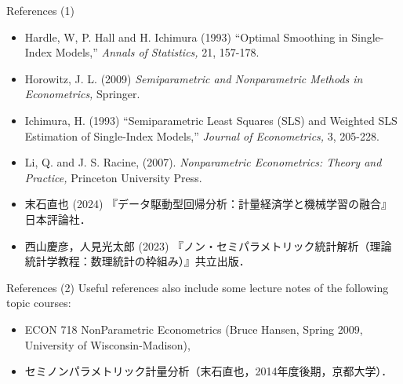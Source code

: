 \documentclass[xcolor=svgnames,dvipdfmx,cjk]{beamer}
\theoremstyle{example}
\begin{document}
  
  \begin{frame}{References (1)}
    \begin{itemize}
      \item Hardle, W, P. Hall and H. Ichimura (1993)
            ``Optimal Smoothing in Single-Index Models,'' \textit{Annals of Statistics,} 21, 157-178.
      \item Horowitz, J. L. (2009)
            \textit{Semiparametric and Nonparametric Methods in Econometrics,}
            Springer.
      \item Ichimura, H. (1993) 
            ``Semiparametric Least Squares (SLS) and Weighted SLS Estimation of Single-Index Models,''
            \textit{Journal of Econometrics,} 3, 205-228. 
      \item Li, Q. and J. S. Racine, (2007). 
            \textit{Nonparametric Econometrics: Theory and Practice,} 
            Princeton University Press.
      \item 末石直也 (2024) 『データ駆動型回帰分析：計量経済学と機械学習の融合』日本評論社．
      \item 西山慶彦，人見光太郎 (2023) 『ノン・セミパラメトリック統計解析（理論統計学教程：数理統計の枠組み）』共立出版．
    \end{itemize}
  \end{frame}


\begin{frame}{References (2)}
\quad 
Useful references also include some lecture notes of the following topic courses:
  \begin{itemize}
    \item ECON 718 NonParametric Econometrics (Bruce Hansen, Spring 2009, University of Wisconsin-Madison),
    \item セミノンパラメトリック計量分析（末石直也，2014年度後期，京都大学）．
  \end{itemize}
\end{frame}
\end{document}
